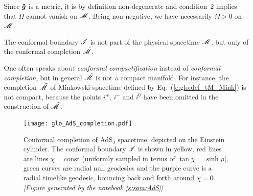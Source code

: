 \begin{remark}
Since $\bm{\tilde{g}}$ is a metric, it is by definition non-degenerate and
condition~2 implies that $\Omega$ cannot vanish on $\mathscr{M}$. Being non-negative,
we have necessarily $\Omega > 0$ on $\mathscr{M}$.
\end{remark}

\begin{remark}
The conformal boundary $\mathscr{I}$ is not part of the physical spacetime
$\mathscr{M}$, but only of the conformal completion $\tilde{\mathscr{M}}$.
\end{remark}

\begin{remark}
One often speaks about
\emph{conformal compactification}
instead of \emph{conformal completion}, but in general $\tilde{\mathscr{M}}$ is not a
compact manifold. For instance,
the completion $\tilde{\mathscr{M}}$ of Minkowski spacetime defined by Eq.~(\ref{e:glo:def_tM_Mink})
is not compact, because the points $i^+$, $i^-$ and $i^0$ have been omitted in the construction of
$\tilde{\mathscr{M}}$.
\end{remark}

\begin{figure}
\centerline{\texttt{[image: glo\_AdS\_completion.pdf]}}
\caption[]{\label{f:glo:AdS_completion} \footnotesize
Conformal completion of AdS$_{4}$ spacetime, depicted on the Einstein cylinder.
The conformal boundary $\mathscr{I}$ is shown in yellow, red lines are lines
$\chi=\mathrm{const}$ (uniformly sampled in terms of $\tan\chi = \sinh\rho$),
green curves are radial null geodesics and the purple curve
is a radial timelike geodesic, bouncing back and forth around $\chi=0$.
\textsl{[Figure generated by the notebook \ref{s:sam:AdS}]}
}
\end{figure}

